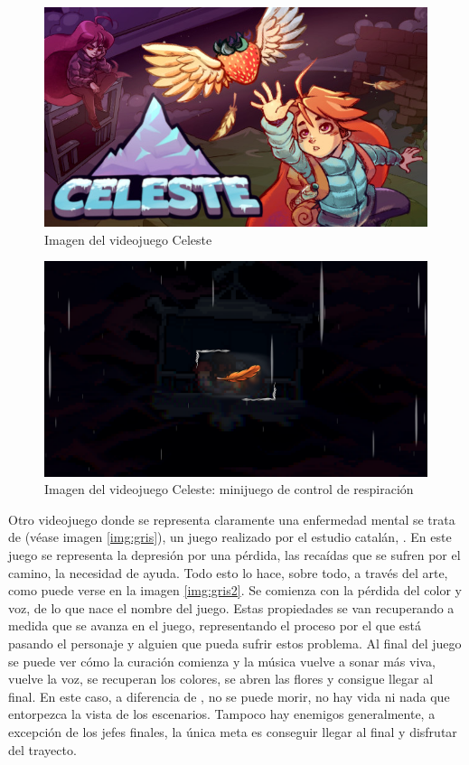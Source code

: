\documentclass[12pt, a4paper,twoside,titlepage]{book}
\begin{document}
\begin{figure}
  \centering
    \includegraphics[scale=.5]{Imagenes videojuegos/Celeste.jpg}
    \caption{Imagen del videojuego Celeste}
    \label{img:featherCelesteA}
\end{figure}
\begin{figure}
  \centering
    \includegraphics[scale=.2]{Imagenes videojuegos/featherceleste}
    \caption{Imagen del videojuego Celeste: minijuego de control de respiración}
    \label{img:featherCelesteB}
\end{figure}

Otro videojuego donde se representa claramente una enfermedad mental se trata de  (véase imagen \ref{img:gris}), un juego realizado por el estudio catalán, \cite{nomadaStudio}. En este juego se representa la depresión por una pérdida, las recaídas que se sufren por el camino, la necesidad de ayuda. Todo esto lo hace, sobre todo, a través del arte, como puede verse en la imagen \ref{img:gris2}. Se comienza con la pérdida del color y voz, de lo que nace el nombre del juego. Estas propiedades se van recuperando a medida que se avanza en el juego, representando el proceso por el que está pasando el personaje y alguien que pueda sufrir estos problema. Al final del juego se puede ver cómo la curación comienza y la música vuelve a sonar más viva, vuelve la voz, se recuperan los colores, se abren las flores y consigue llegar al final. En este caso, a diferencia de , no se puede morir, no hay vida ni nada que entorpezca la vista de los escenarios. Tampoco hay enemigos generalmente, a excepción de los jefes finales, la única meta es conseguir llegar al final y disfrutar del trayecto. 
\end{document}
